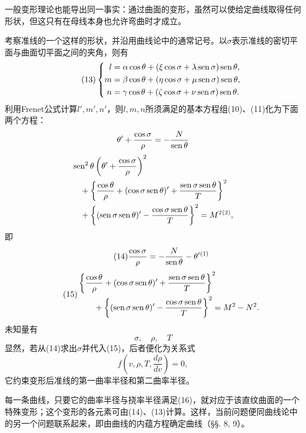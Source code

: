 一般变形理论也能导出同一事实：通过曲面的变形，虽然可以使给定曲线取得任何形状，但这只有在母线本身也允许弯曲时才成立。

考察准线的一个这样的形状，并沿用曲线论中的通常记号。以\(\sigma\)表示准线的密切平面与曲面切平面之间的夹角，则有
\begin{equation}\tag{13}
\left\{
\begin{aligned}
 l&=\alpha\cos\theta+(\xi\cos\sigma+\lambda\operatorname{sen}\sigma)\operatorname{sen}\theta,\\
 m&=\beta\cos\theta+(\eta\cos\sigma+\mu\operatorname{sen}\sigma)\operatorname{sen}\theta,\\
 n&=\gamma\cos\theta+(\zeta\cos\sigma+\nu\operatorname{sen}\sigma)\operatorname{sen}\theta.
\end{aligned}
\right.
\end{equation}
利用Frenet公式计算\(l',m',n'\)，则\(l,m,n\)所须满足的基本方程组(10)、(11)化为下面两个方程：
\[
 \theta'+\frac{\cos\sigma}{\rho}=-\frac{N}{\operatorname{sen}\theta}
\]
\[
\begin{aligned}
&\sen^2\theta\left(\theta'+\frac{\cos\sigma}{\rho}\right)^2\\
&\quad+\left\{\frac{\cos\theta}{\rho}+(\cos\sigma\sen\theta)'+\frac{\sen\sigma\sen\theta}{T}\right\}^2\\
&\quad+\left\{(\sen\sigma\sen\theta)'-\frac{\cos\sigma\sen\theta}{T}\right\}^2=M^2\srcfnmark{2},
\end{aligned}
\]
即
\begin{equation}\tag{14}
 \frac{\cos\sigma}{\rho}=-\frac{N}{\sen\theta}-\theta'\srcfnmark{1}
\end{equation}
\begin{equation}\tag{15}
\begin{aligned}
&\left\{\frac{\cos\theta}{\rho}+(\cos\sigma\operatorname{sen}\theta)'+\frac{\operatorname{sen}\sigma\operatorname{sen}\theta}{T}\right\}^2\\
&\qquad+\left\{(\operatorname{sen}\sigma\operatorname{sen}\theta)'-\frac{\cos\sigma\operatorname{sen}\theta}{T}\right\}^2=M^2-N^2.
\end{aligned}
\end{equation}
未知量有
\[
 \sigma,
 \quad \rho,
 \quad T
\]
显然，若从(14)求出\(\sigma\)并代入(15)，后者便化为关系式
\begin{equation}\tag{16}
  f\left(v,\rho,T,\frac{d\rho}{dv}\right)=0,
\end{equation}
它约束变形后准线的第一曲率半径和第二曲率半径。

每一条曲线，只要它的曲率半径与挠率半径满足(16)，就对应于该直纹曲面的一个特殊变形；这个变形的各元素可由(14)、(13)计算。这样，当前问题便同曲线论中的另一个问题联系起来，即由曲线的内蕴方程确定曲线（\S\S. 8, 9）。

